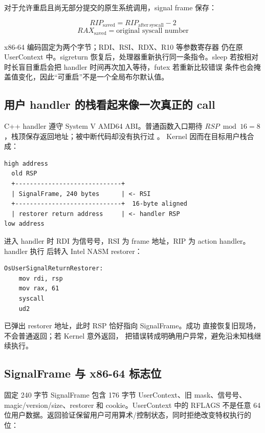对于允许重启且尚无部分提交的原生系统调用，signal frame 保存：

\[
  RIP_{\mathrm{saved}}=RIP_{\mathrm{after\ syscall}}-2
\]
\[
  RAX_{\mathrm{saved}}=\text{original syscall number}
\]

x86-64  编码固定为两个字节；RDI、RSI、RDX、R10 等参数寄存器
仍在原 UserContext 中。sigreturn 恢复后，处理器重新执行同一条指令。sleep
若按相对时长盲目重启会把 handler 时间再次加入等待，futex 若重新比较错误
条件也会掩盖值变化，因此“可重启”不是一个全局布尔默认值。

\subsection{用户 handler 的栈看起来像一次真正的 call}

C++ handler 遵守 System V AMD64 ABI。普通函数入口期待
\(RSP\bmod16=8\)，栈顶保存返回地址；被中断代码却没有执行过 。
Kernel 因而在目标用户栈合成：

\begin{lstlisting}
high address
  old RSP
  +-----------------------------+
  | SignalFrame, 240 bytes      | <- RSI
  +-----------------------------+  16-byte aligned
  | restorer return address     | <- handler RSP
low address
\end{lstlisting}

进入 handler 时 RDI 为信号号，RSI 为 frame 地址，RIP 为 action handler。
handler 执行  后转入 Intel NASM restorer：

\begin{lstlisting}[language={[x86masm]Assembler}]
OsUserSignalReturnRestorer:
    mov rdi, rsp
    mov rax, 61
    syscall
    ud2
\end{lstlisting}

 已弹出 restorer 地址，此时 RSP 恰好指向 SignalFrame。成功
 直接恢复旧现场，不会普通返回；若 Kernel 意外返回，
 把错误转成明确用户异常，避免沿未知栈继续执行。

\subsection{SignalFrame 与 x86-64 标志位}

固定 240 字节 SignalFrame 包含 176 字节 UserContext、旧 mask、信号号、
magic/version/size、restorer 和 cookie。UserContext 中的 RFLAGS 不是任意
64 位用户数据。返回验证保留用户可用算术/控制状态，同时拒绝改变特权执行的位：

